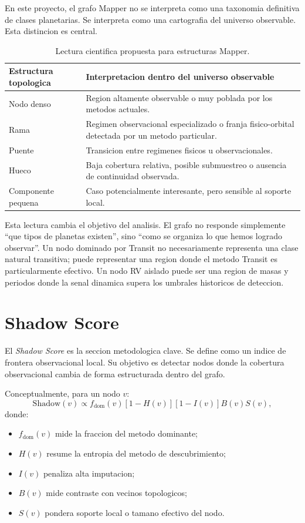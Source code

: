 \documentclass[11pt]{article}
\begin{document}
En este proyecto, el grafo Mapper no se interpreta como una taxonomia definitiva de clases planetarias. Se interpreta como una cartografia del universo observable. Esta distincion es central.

\begin{table}[H]
\centering
\caption{Lectura cientifica propuesta para estructuras Mapper.}
\begin{tabularx}{\linewidth}{lX}
\toprule
Estructura topologica & Interpretacion dentro del universo observable \\
\midrule
Nodo denso & Region altamente observable o muy poblada por los metodos actuales. \\
Rama & Regimen observacional especializado o franja fisico-orbital detectada por un metodo particular. \\
Puente & Transicion entre regimenes fisicos u observacionales. \\
Hueco & Baja cobertura relativa, posible submuestreo o ausencia de continuidad observada. \\
Componente pequena & Caso potencialmente interesante, pero sensible al soporte local. \\
\bottomrule
\end{tabularx}
\end{table}

Esta lectura cambia el objetivo del analisis. El grafo no responde simplemente ``que tipos de planetas existen'', sino ``como se organiza lo que hemos logrado observar''. Un nodo dominado por Transit no necesariamente representa una clase natural transitiva; puede representar una region donde el metodo Transit es particularmente efectivo. Un nodo RV aislado puede ser una region de masas y periodos donde la senal dinamica supera los umbrales historicos de deteccion.

\section{Shadow Score}

El \textit{Shadow Score} es la seccion metodologica clave. Se define como un indice de frontera observacional local. Su objetivo es detectar nodos donde la cobertura observacional cambia de forma estructurada dentro del grafo.

Conceptualmente, para un nodo \(v\):
\[
  \mathrm{Shadow}(v)
  \propto
  f_{\mathrm{dom}}(v)
  \left[1-H(v)\right]
  \left[1-I(v)\right]
  B(v)
  S(v),
\]
donde:
\begin{itemize}
  \item \(f_{\mathrm{dom}}(v)\) mide la fraccion del metodo dominante;
  \item \(H(v)\) resume la entropia del metodo de descubrimiento;
  \item \(I(v)\) penaliza alta imputacion;
  \item \(B(v)\) mide contraste con vecinos topologicos;
  \item \(S(v)\) pondera soporte local o tamano efectivo del nodo.
\end{itemize}
\end{document}
